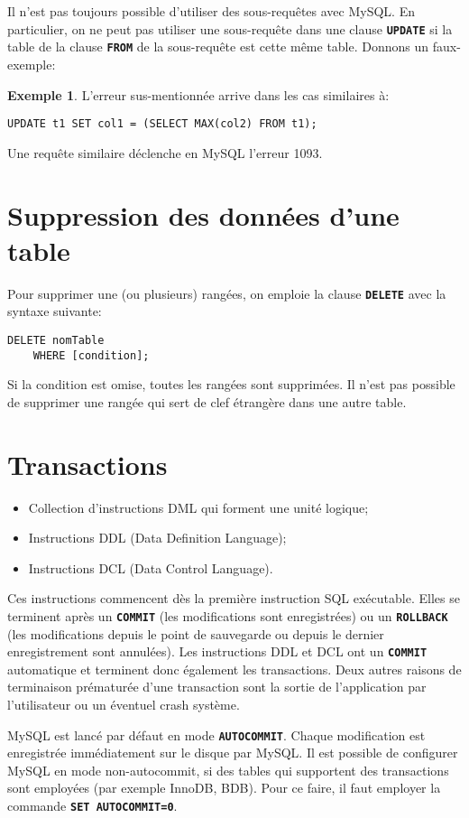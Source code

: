 \documentclass[a4paper, 12pt]{report}
\newcommand{\textSQL}[1]{\texttt{\textbf{#1}}}
\theoremstyle{definition} \newtheorem{ex}{Exemple}
\begin{document}
Il n'est pas toujours possible d'utiliser des sous-requêtes avec MySQL. En particulier, on ne peut pas utiliser une sous-requête dans une clause \textSQL{UPDATE} si la table de la clause \textSQL{FROM} de la sous-requête est cette même table. Donnons un faux-exemple:
\begin{ex}
L'erreur sus-mentionnée arrive dans les cas similaires à:
\begin{lstlisting}[frame=single]
UPDATE t1 SET col1 = (SELECT MAX(col2) FROM t1);
\end{lstlisting}
Une requête similaire déclenche en MySQL l'erreur 1093.
\end{ex}

\section{Suppression des données d'une table}
Pour supprimer une (ou plusieurs) rangées, on emploie la clause \textSQL{DELETE} avec la syntaxe suivante:
\begin{lstlisting}[frame=single]
DELETE nomTable
	WHERE [condition];
\end{lstlisting}
Si la condition est omise, toutes les rangées sont supprimées. Il n'est pas possible de supprimer une rangée qui sert de clef étrangère dans une autre table.

\section{Transactions}
\begin{itemize}
\item Collection d'instructions DML qui forment une unité logique;
\item Instructions DDL (Data Definition Language);
\item Instructions DCL (Data Control Language).
\end{itemize}
Ces instructions commencent dès la première instruction SQL exécutable. Elles se terminent après un \textSQL{COMMIT} (les modifications sont enregistrées) ou un \textSQL{ROLLBACK} (les modifications depuis le point de sauvegarde ou depuis le dernier enregistrement sont annulées). Les instructions DDL et DCL ont un \textSQL{COMMIT} automatique et terminent donc également les transactions. Deux autres raisons de terminaison prématurée d'une transaction sont la sortie de l'application par l'utilisateur ou un éventuel crash système.

MySQL est lancé par défaut en mode \textSQL{AUTOCOMMIT}. Chaque modification est enregistrée immédiatement sur le disque par MySQL. Il est possible de configurer MySQL en mode non-autocommit, si des tables qui supportent des transactions sont employées (par exemple InnoDB, BDB). Pour ce faire, il faut employer la commande \textSQL{SET AUTOCOMMIT=0}.
\end{document}

